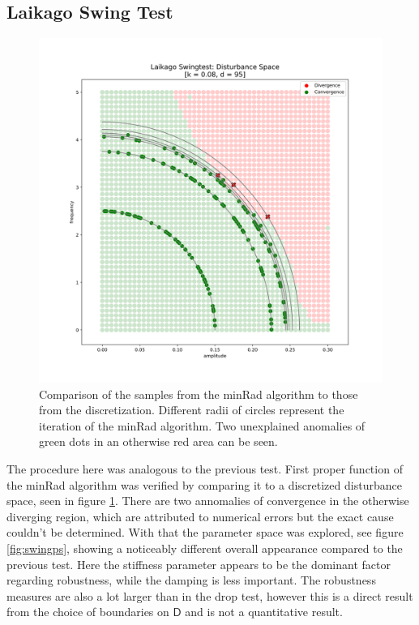     \subsection{Laikago Swing Test}

    \begin{figure}[h]
    \centering
    \includegraphics[width=.5\linewidth]{figures/swingtest_ds_overay_v3.png}
    \caption[Overlay of minRad and Discretized Disturbance Space, Swing Test]{Comparison of the samples from the minRad algorithm to those from the discretization. Different radii of circles represent the iteration of the minRad algorithm. Two unexplained anomalies of green dots in an otherwise red area can be seen.}
    \label{fig:swingoverlay}
    \end{figure}   

    The procedure here was analogous to the previous test. First proper function of the minRad algorithm was verified by comparing it to a discretized disturbance space, seen in figure \ref{fig:swingoverlay}. There are two annomalies of convergence in the otherwise diverging region, which are attributed to numerical errors but the exact cause couldn't be determined. With that the parameter space was explored, see figure \ref{fig:swingps}, showing a noticeably different overall appearance compared to the previous test. Here the stiffness parameter appears to be the dominant factor regarding robustness, while the damping is less important. The robustness measures are also a lot larger than in the drop test, however this is a direct result from the choice of boundaries on $\mathsf{D}$ and is not a quantitative result.   
     

